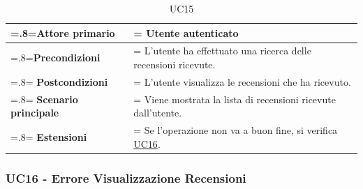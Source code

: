             \begin{table}[H]
                \centering
                \renewcommand{\arraystretch}{1.8}
                \renewcommand\tabularxcolumn[1]{m{#1}}
                \begin{tabularx}{0.9\textwidth} {
                    >{\hsize=.8\hsize\linewidth=\hsize}X
                    >{\hsize=1.2\hsize\linewidth=\hsize}X}
                    \hline
                    \textbf{Attore primario} & Utente autenticato \\
                    \hline
                    \textbf{Precondizioni} & L'utente ha effettuato una ricerca delle recensioni ricevute. \\
                    \hline
                    \textbf{Postcondizioni} & L'utente visualizza le recensioni che ha ricevuto. \\
                    \hline
                    \textbf{Scenario principale} & Viene mostrata la lista di recensioni ricevute dall'utente. \\
                    \hline
                    \textbf{Estensioni} & Se l'operazione non va a buon fine, si verifica \hyperref[UC16]{UC16}. \\
                    \hline
                \end{tabularx}
                \caption{UC15}
            \end{table}

        \subsubsection{UC16 - Errore Visualizzazione Recensioni}
        \label{UC16}

